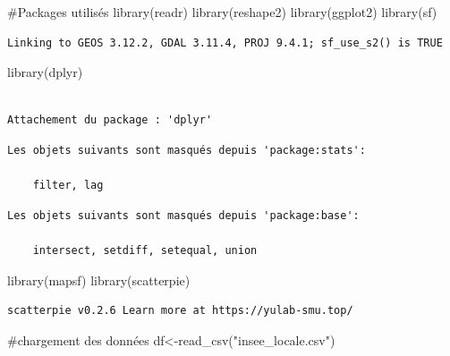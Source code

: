 \documentclass[
  french,
  11pt,
  a4paper,
]{article}
\newenvironment{Shaded}{}{}
\newcommand{\CommentTok}[1]{\textcolor[rgb]{0.42,0.45,0.49}{#1}}
\newcommand{\FunctionTok}[1]{\textcolor[rgb]{0.44,0.26,0.76}{#1}}
\newcommand{\NormalTok}[1]{\textcolor[rgb]{0.14,0.16,0.18}{#1}}
\newcommand{\OtherTok}[1]{\textcolor[rgb]{0.44,0.26,0.76}{#1}}
\newcommand{\StringTok}[1]{\textcolor[rgb]{0.01,0.18,0.38}{#1}}
\begin{document}
\begin{Shaded}
\begin{Highlighting}[]
\CommentTok{\#Packages utilisés}
\FunctionTok{library}\NormalTok{(readr)}
\FunctionTok{library}\NormalTok{(reshape2)}
\FunctionTok{library}\NormalTok{(ggplot2)}
\FunctionTok{library}\NormalTok{(sf)}
\end{Highlighting}
\end{Shaded}

\begin{verbatim}
Linking to GEOS 3.12.2, GDAL 3.11.4, PROJ 9.4.1; sf_use_s2() is TRUE
\end{verbatim}

\begin{Shaded}
\begin{Highlighting}[]
\FunctionTok{library}\NormalTok{(dplyr)}
\end{Highlighting}
\end{Shaded}

\begin{verbatim}

Attachement du package : 'dplyr'
\end{verbatim}

\begin{verbatim}
Les objets suivants sont masqués depuis 'package:stats':

    filter, lag
\end{verbatim}

\begin{verbatim}
Les objets suivants sont masqués depuis 'package:base':

    intersect, setdiff, setequal, union
\end{verbatim}

\begin{Shaded}
\begin{Highlighting}[]
\FunctionTok{library}\NormalTok{(mapsf)}
\FunctionTok{library}\NormalTok{(scatterpie)}
\end{Highlighting}
\end{Shaded}

\begin{verbatim}
scatterpie v0.2.6 Learn more at https://yulab-smu.top/
\end{verbatim}

\begin{Shaded}
\begin{Highlighting}[]
\CommentTok{\#chargement des données}
\NormalTok{df}\OtherTok{\textless{}{-}}\FunctionTok{read\_csv}\NormalTok{(}\StringTok{"insee\_locale.csv"}\NormalTok{)}
\end{Highlighting}
\end{Shaded}
\end{document}
